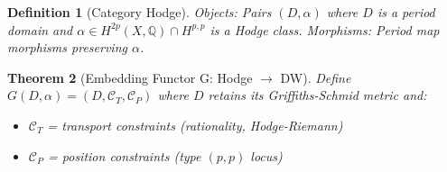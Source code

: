 \documentclass[12pt]{article}
\newtheorem{theorem}{Theorem}
\newtheorem{definition}[theorem]{Definition}
\begin{document}
\begin{definition}[Category Hodge]
Objects: Pairs $(D, \alpha)$ where $D$ is a period domain and 
$\alpha \in H^{2p}(X,\mathbb{Q}) \cap H^{p,p}$ is a Hodge class.
Morphisms: Period map morphisms preserving $\alpha$.
\end{definition}

\begin{theorem}[Embedding Functor G: Hodge $\to$ DW]
Define $G(D, \alpha) = (D, \mathcal{C}_T, \mathcal{C}_P)$ where $D$ retains its 
Griffiths-Schmid metric and:
\begin{itemize}
\item $\mathcal{C}_T$ = transport constraints (rationality, Hodge-Riemann)
\item $\mathcal{C}_P$ = position constraints (type $(p,p)$ locus)
\end{itemize}
\end{theorem}
\end{document}
